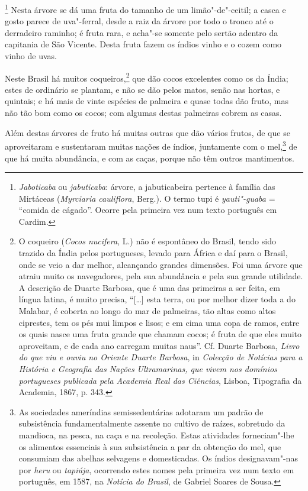 \footnote{ \textit{Jaboticaba} ou
\textit{jabuticaba}: árvore, a jabuticabeira pertence à família das
Mirtáceas (\textit{Myrciaria cauliflora}, Berg.). O termo tupi é
\textit{yauti"-guaba} = ``comida de cágado''. Ocorre pela primeira vez num
texto português em Cardim.} Nesta árvore se dá uma fruta do
tamanho de um limão"-de"-ceitil; a casca e gosto parece de uva"-ferral,
desde a raiz da árvore por todo o tronco até o derradeiro raminho; é
fruta rara, e acha"-se somente pelo sertão adentro da capitania de São
Vicente. Desta fruta fazem os índios vinho e o cozem como vinho de uvas.

Neste Brasil há muitos coqueiros,\footnote{ O coqueiro (\textit{Cocos
nucifera}, L.) não é espontâneo do Brasil, tendo sido trazido da Índia
pelos portugueses, levado para África e daí para o Brasil, onde se veio
a dar melhor, alcançando grandes dimensões. Foi uma árvore que atraiu
muito os navegadores, pela sua abundância e pela sua grande utilidade.
A descrição de Duarte Barbosa, que é uma das primeiras a ser feita, em
língua latina, é muito precisa, ``[\ldots{}] esta terra, ou por
melhor dizer toda a do Malabar, é coberta ao longo do mar de palmeiras,
tão altas como altos ciprestes, tem os pés mui limpos e lisos; e em
cima uma copa de ramos, entre os quais nasce uma fruta grande que
chamam cocos; é fruta de que eles muito aproveitam, e de cada ano
carregam muitas naus''. Cf. Duarte Barbosa, \textit{Livro do
que viu e ouviu no Oriente Duarte Barbosa}, in \textit{Colecção de
Notícias para a História e Geografia das Nações Ultramarinas, que vivem
nos domínios portugueses publicada pela Academia Real das Ciências}, 
Lisboa, Tipografia da Academia, 1867, p. 343.} que dão cocos
excelentes como os da Índia; estes de ordinário se plantam, e não se
dão pelos matos, senão nas hortas, e quintais; e há mais de vinte
espécies de palmeira e quase todas dão fruto, mas não tão bom como os
cocos; com algumas destas palmeiras cobrem as casas.

 Além destas árvores de fruto há muitas outras que dão vários frutos, de
que se aproveitaram e sustentaram muitas nações de índios, juntamente
com o mel,\footnote{ As sociedades ameríndias semissedentárias
adotaram um padrão de subsistência fundamentalmente assente no
cultivo de raízes, sobretudo da mandioca, na pesca, na caça e na
recoleção. Estas atividades forneciam"-lhe os alimentos essenciais à
sua subsistência a par da obtenção do mel, que consumiam das abelhas
selvagens e domesticadas. Os índios designavam"-nas por \textit{heru} ou
\textit{tapiúja}, ocorrendo estes nomes pela primeira vez num texto em
português, em 1587, na \textit{Notícia do Brasil}, de Gabriel Soares de
Sousa.} de que há muita abundância, e com as caças, porque não têm outros mantimentos.

